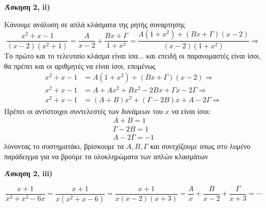 \documentclass[a4paper,table]{report}
\begin{document}
\textbf{Άσκηση 2, ii)}

Κάνουμε ανάλυση σε απλά κλάσματα της ρητής συναρτησης
\[
  \frac{x^{2}+x-1}{(x-2)(x^{2}+1)} = \frac{A}{x-2} + \frac{Bx+\Gamma}{1+x^{2}} = 
  \frac{A(1+x^{2})+(Bx+\Gamma)(x-2)}{(x-2)(1+x^{2})} \Rightarrow 
\]
Το πρώτο και το τελευταίο κλάσμα είναι ίσα... και επειδή οι παρανομαστές είναι ίσοι, θα 
πρέπει και οι αριθμητές να είναι ίσοι, επομένως
\begin{align*}
  x^{2}+x-1 &= {A(1+x^{2})+(Bx+\Gamma)(x-2)} \Rightarrow  \\
  x^{2}+x-1 &= A+Ax^{2}+Bx^{2}-2Bx+\Gamma x -2\Gamma \Rightarrow  \\
  x^{2}+x-1 &= (A+B)x^{2}+(\Gamma -2B)x + A-2\Gamma \Rightarrow 
\end{align*}
Πρέπει οι αντίστοιχοι συντελεστές των δυνάμεων του $x$ να είναι ίσοι:
\begin{align*}
  A+B=1 \\
  \Gamma-2B=1 \\
  A-2\Gamma = -1
\end{align*}
λύνοντας το συστηματάκι, βρίσκουμε τα $ A,B, \Gamma $ και συνεχίζουμε οπως στο λυμένο 
παράδειγμα για να βρούμε τα ολοκληρώματα των απλών κλασμάτων

\vspace{\baselineskip}

\textbf{Άσκηση 2, iii)}

\[
   \frac{x+1}{x^{3}+x^{2}-6x} = \frac{x+1}{x(x^{2}+x-6)} = \frac{x+1}{x(x-2)(x+3)} =
   \frac{A}{x} + \frac{B}{x-2} + \frac{\Gamma}{x+3} = \cdots 
   \] 
\end{document}
